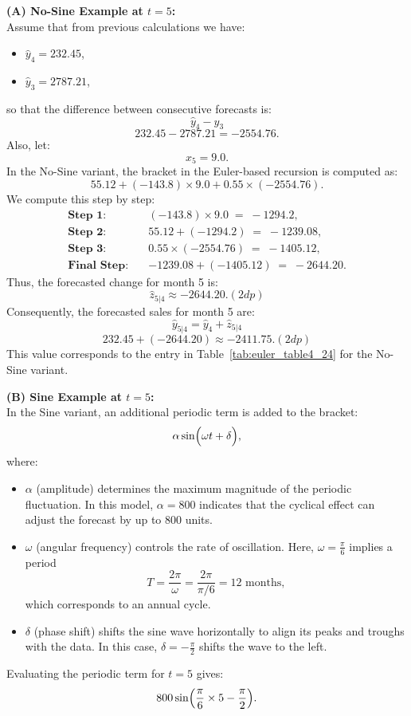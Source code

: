 \documentclass{article}
\begin{document}
\textbf{(A) No-Sine Example at \(t=5\):}\\[2mm]
Assume that from previous calculations we have:
\begin{itemize}
    \item \(\hat{y}_4 = 232.45\),
    \item \(\hat{y}_3 = 2787.21\),
\end{itemize}
so that the difference between consecutive forecasts is:
\[
\hat{y}_4 - \hat{y}_3 \] \[232.45 - 2787.21 = -2554.76. 
\]
Also, let:
\[
x_5 = 9.0.
\]
In the No-Sine variant, the bracket in the Euler-based recursion is computed as:
\[
55.12 + (-143.8)\times 9.0 + 0.55\times (-2554.76).
\]
We compute this step by step:
\begin{align*}
\textbf{Step 1:} \quad & (-143.8) \times 9.0 \;=\; -1294.2, \\
\textbf{Step 2:} \quad & 55.12 + (-1294.2) \;=\; -1239.08, \\
\textbf{Step 3:} \quad & 0.55 \times (-2554.76) \;=\; -1405.12, \quad \\[1mm]
\textbf{Final Step:} \quad & -1239.08 + (-1405.12) \;=\; -2644.20. 
\end{align*}
Thus, the forecasted change for month 5 is:
\[
\hat{z}_{5|4} \approx -2644.20. (2dp)
\]
Consequently, the forecasted sales for month 5 are:
\[
\hat{y}_{5|4} = \hat{y}_4 + \hat{z}_{5|4} \]\[ 232.45 + (-2644.20) \approx -2411.75. (2dp)
\]
This value corresponds to the entry in Table~\ref{tab:euler_table4_24} for the No-Sine variant.

\bigskip

\textbf{(B) Sine Example at \(t=5\):}\\[2mm]
In the Sine variant, an additional periodic term is added to the bracket:
\[
\alpha\sin\Bigl(\omega t + \delta\Bigr),
\]
where:
\begin{itemize}
    \item \(\alpha\) (amplitude) determines the maximum magnitude of the periodic fluctuation. In this model, \(\alpha = 800\) indicates that the cyclical effect can adjust the forecast by up to 800 units.
    \item \(\omega\) (angular frequency) controls the rate of oscillation. Here, \(\omega = \frac{\pi}{6}\) implies a period 
    \[
    T = \frac{2\pi}{\omega} = \frac{2\pi}{\pi/6} = 12 \text{ months},
    \]
    which corresponds to an annual cycle.
    \item \(\delta\) (phase shift) shifts the sine wave horizontally to align its peaks and troughs with the data. In this case, \(\delta = -\frac{\pi}{2}\) shifts the wave to the left.
\end{itemize}
Evaluating the periodic term for \(t=5\) gives:
\[
800\sin\Bigl(\frac{\pi}{6}\times 5 - \frac{\pi}{2}\Bigr).
\]
\end{document}

